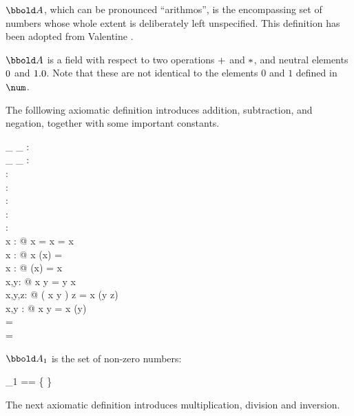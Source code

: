 \documentclass[12pt]{article}
\begin{document}
$\arithmos$, which can be pronounced “arithmos”, is the encompassing
set of numbers whose whole extent is deliberately left
unspecified. This definition has been adopted from Valentine
\cite{Valentine2012}.

\begin{zed}
  [\arithmos] 
\end{zed}

$\arithmos$ is a field with respect to two operations $+$ and
$*$, and neutral elements $0$ and $1.0$. Note that these
are not identical to the elements $0$ and $1$ defined in $\num$.

The folllowing axiomatic definition introduces addition, subtraction,
and negation, together with some important constants.
%
\begin{axdef}
  \_ \aplus \_ : \arithmos \cross \arithmos \fun \arithmos\\
  \_ \aminus \_ : \arithmos \cross \arithmos \fun \arithmos\\
  \aneg : \arithmos \fun \arithmos\\
  \azero : \arithmos\\
  \aone : \arithmos\\
  \atwo : \arithmos\\
  \aten : \arithmos\\
  \where
  \forall x : \arithmos @ x \aplus \azero = \azero \aplus x = x \\
  \forall x : \arithmos @ x \aplus (\aneg x) = \azero \\
  \forall x : \arithmos @ \aneg (\aneg x) = x \\
  \forall x,y: \arithmos @ x \aplus y = y \aplus x \\
  \forall x,y,z: \arithmos @ ( x \aplus y ) \aplus z = x \aplus (y
  \aplus z) \\
  \forall x,y : \arithmos @ x \aminus y = x \aplus (\aneg y)\\
  \atwo = \aone \aplus \aone \\
  \aten = \atwo \aplus \atwo \aplus \atwo \aplus \atwo \aplus \atwo \\
\end{axdef}
% 
$\arithmos_1$ is the set of non-zero numbers:
%
\begin{zed}
  \arithmos_1 == \arithmos \setminus \{ \azero \}
\end{zed}
%
The next axiomatic definition introduces multiplication, division and
inversion. 
%
\end{document}
